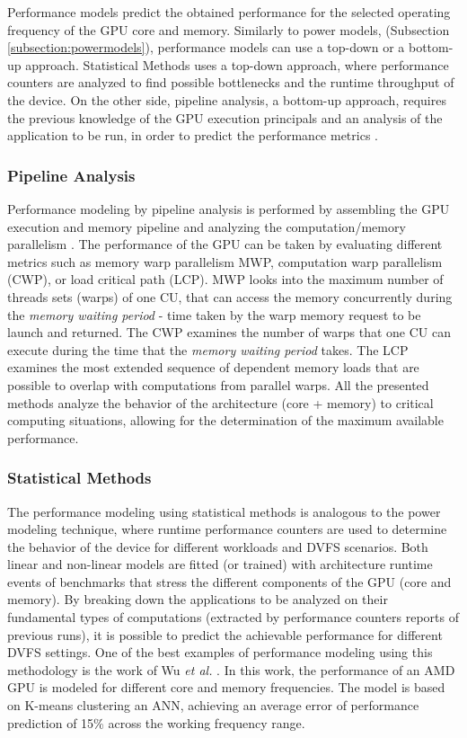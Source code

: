 Performance models predict the obtained performance for the selected operating frequency of the GPU core and memory. Similarly to power models, (Subsection \ref{subsection:powermodels}), performance models can use a top-down or a bottom-up approach. Statistical Methods uses a top-down approach, where performance counters are analyzed to find possible bottlenecks and the runtime throughput of the device. On the other side, pipeline analysis, a bottom-up approach, requires the previous knowledge of the GPU execution principals and an analysis of the application to be run, in order to predict the performance metrics \cite{mei_survey_2016}. 

\subsubsection{Pipeline Analysis}
Performance modeling by pipeline analysis is performed by assembling the GPU execution and memory pipeline and analyzing the computation/memory parallelism \cite{mei_survey_2016}. The performance of the GPU can be taken by evaluating different metrics such as memory warp parallelism MWP, computation warp parallelism (CWP), or load critical path (LCP). MWP looks into the maximum number of threads sets (warps) of one CU, that can access the memory concurrently during the \textit{memory waiting period} - time taken by the warp memory request to be launch and returned. The CWP examines the number of warps that one CU can execute during the time that the \textit{memory waiting period} takes. The LCP examines the most extended sequence of dependent memory loads that are possible to overlap with computations from parallel warps. All the presented methods analyze the behavior of the architecture (core + memory) to critical computing situations, allowing for the determination of the maximum available performance.

\subsubsection{Statistical Methods}
The performance modeling using statistical methods is analogous to the power modeling technique, where runtime performance counters are used to determine the behavior of the device for different workloads and DVFS scenarios. Both linear and non-linear models are fitted (or trained) with architecture runtime events of benchmarks that stress the different components of the GPU (core and memory). By breaking down the applications to be analyzed on their fundamental types of computations (extracted by performance counters reports of previous runs), it is possible to predict the achievable performance for different DVFS settings. One of the best examples of performance modeling using this methodology is the work of Wu \textit{et al.} \cite{wu_gpgpu_2015}. In this work, the performance of an AMD GPU is modeled for different core and memory frequencies. The model is based on K-means clustering an ANN, achieving an average error of performance prediction of 15\% across the working frequency range.

